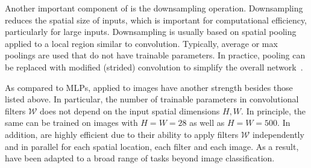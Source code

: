 Another important component of \cnns is the downsampling operation. Downsampling reduces the spatial size of inputs, which is important for computational efficiency, particularly for large inputs. Downsampling is usually based on spatial pooling applied to a local region similar to convolution. Typically, average or max poolings are used that do not have trainable parameters. In practice, pooling can be replaced with modified (strided) convolution to simplify the overall network~\citep{springenberg2014striving}.

As compared to MLPs, \cnns applied to images have another strength besides those listed above. In particular, the number of trainable parameters in convolutional filters $\mathcal{W}$ does not depend on the input spatial dimensions $H,W$. In principle, the same \cnn can be trained on images with $H=W=28$ as well as $H=W=500$. In addition, \cnns are highly efficient due to their ability to apply filters $\mathcal{W}$ independently and in parallel for each spatial location, each filter and each image. As a result, \cnns have been adapted to a broad range of tasks beyond image classification.

\vspace{-3pt}
